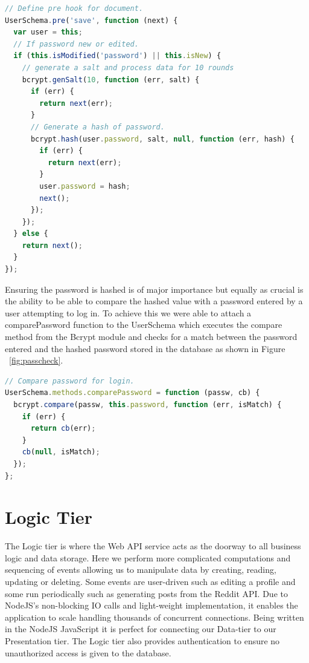 \begin{lstlisting}[language=JavaScript,caption={Password Hashing},captionpos=b,label={fig:presave}]
// Define pre hook for document.
UserSchema.pre('save', function (next) {
  var user = this;
  // If password new or edited.
  if (this.isModified('password') || this.isNew) {
    // generate a salt and process data for 10 rounds
    bcrypt.genSalt(10, function (err, salt) {
      if (err) {
        return next(err);
      }
      // Generate a hash of password.
      bcrypt.hash(user.password, salt, null, function (err, hash) {
        if (err) {
          return next(err);
        }
        user.password = hash;
        next();
      });
    });
  } else {
    return next();
  }
});

\end{lstlisting}
Ensuring the password is hashed is of major importance but equally as crucial is the ability to be able to compare the hashed value with a password entered by a user attempting to log in. To achieve this we were able to attach a comparePassword function to the UserSchema which executes the compare method from the Bcrypt module and checks for a match between the password entered and the hashed password stored in the database as shown in Figure ~\ref{fig:passcheck}. 
\begin{lstlisting}[language=JavaScript,caption={Password Comparision},captionpos=b,label={fig:passcheck}]
// Compare password for login.
UserSchema.methods.comparePassword = function (passw, cb) {
  bcrypt.compare(passw, this.password, function (err, isMatch) {
    if (err) {
      return cb(err);
    }
    cb(null, isMatch);
  });
};
\end{lstlisting}

\section{Logic Tier}

The Logic tier is where the Web API service acts as the doorway to all business logic and data storage.
Here we perform more complicated computations and sequencing of events allowing us to manipulate data by creating, reading, updating or deleting. Some events are user-driven such as editing a profile and some run periodically such as generating posts from the Reddit API. Due to NodeJS's non-blocking IO calls and light-weight implementation, it enables the application to scale handling thousands of concurrent connections. Being written in the NodeJS JavaScript it is perfect for connecting our Data-tier to our Presentation tier. The Logic tier also provides authentication to ensure no unauthorized access is given to the database.

